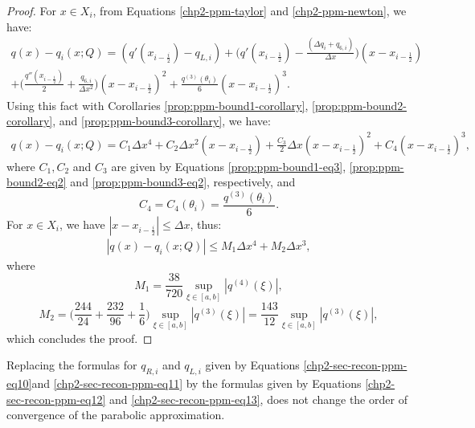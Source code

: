 \begin{proof}
	For $x \in X_i$, from Equations \eqref{chp2-ppm-taylor} and \eqref{chp2-ppm-newton}, we have:
	\begin{equation*}
		\begin{split}
			q(x)-q_i(x;Q) = (q'(x_{i-\frac{i}{2}})-q_{L,i})	
			+ \bigg(q'(x_{i-\frac{1}{2}})-  \frac{(\Delta q_i + q_{6, i})}{\Delta x}\bigg)(x-x_{i-\frac{1}{2}})
			\\+ \bigg(\frac{q''(x_{i-\frac{1}{2}})}{2} + \frac{q_{6, i}}{\Delta x^2}\bigg)(x-x_{i-\frac{1}{2}})^2
			+ \frac{q^{(3)}(\theta_i)}{6}(x-x_{i-\frac{1}{2}})^3.
		\end{split}
	\end{equation*}
	Using this fact with Corollaries \ref{prop:ppm-bound1-corollary}, \ref{prop:ppm-bound2-corollary},
	and  \ref{prop:ppm-bound3-corollary}, we have:
	\begin{equation*}
		\begin{split}
			q(x)-q_i(x;Q) =  C_1 \Delta x ^4 + C_2 \Delta x ^2(x-x_{i-\frac{1}{2}})
			+ \frac{C_3}{2} \Delta x (x-x_{i-\frac{1}{2}})^2
			+ C_4(x-x_{i-\frac{1}{2}})^3,
		\end{split}
	\end{equation*}
	where $C_1, C_2$ and $C_3$ are given by Equations \eqref{prop:ppm-bound1-eq3},
	\eqref{prop:ppm-bound2-eq2} and \eqref{prop:ppm-bound3-eq2}, respectively, and
	\begin{equation}
		\label{prop:ppm-bound4-eq3}
		C_4 = C_4(\theta_i) = \frac{q^{(3)}(\theta_i)}{6}.
	\end{equation}
	For $x\in X_i$, we have $|x -x_{i-\frac{i}{2}}| \leq \Delta x$, thus:
	\begin{equation*}
		\begin{split}
			|q(x)-q_i(x;Q)| \leq  M_1 \Delta x ^4 + M_2 \Delta x ^3,
		\end{split}
	\end{equation*}
	where 
	\begin{equation*}
		M_1 = \frac{38}{720}\sup_{\xi \in [a,b]} |q^{(4)}(\xi)|, 
	\end{equation*}
	\begin{equation*}
		M_2 = \bigg(\frac{244}{24} + \frac{232}{96} + \frac{1}{6} \bigg)
		\sup_{\xi \in [a,b]} |q^{(3)}(\xi)| = \frac{143}{12} \sup_{\xi \in [a,b]} |q^{(3)}(\xi)|,
	\end{equation*}
	which concludes the proof.
\end{proof}

\begin{remark}
	Replacing the formulas for $q_{R,i}$ and $q_{L,i}$ given by Equations
	\eqref{chp2-sec-recon-ppm-eq10}and \eqref{chp2-sec-recon-ppm-eq11}
	by the formulas given by Equations \eqref{chp2-sec-recon-ppm-eq12}
	and \eqref{chp2-sec-recon-ppm-eq13}, does not change the order of convergence
	of the parabolic approximation.
\end{remark}

